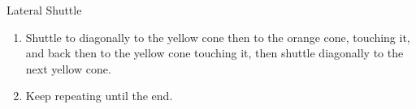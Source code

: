 \begin{oddBlock}{Lateral Shuttle}
\begin{minipage}[t]{\linewidth}
\begin{minipage}{.6\linewidth}
\begin{enumerate}
            \item Shuttle to diagonally to the yellow cone then to the orange cone, touching it, and back then to the yellow cone touching it, then shuttle diagonally to the next yellow cone.
            \item Keep repeating until the end.
        \end{enumerate}
    \end{minipage}
\end{minipage}
\end{oddBlock}